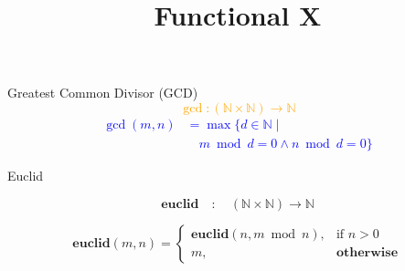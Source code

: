 \documentclass[12pt,t]{beamer}
\title{Functional X}
\begin{document}
{
}

\begin{frame}{Greatest Common Divisor (GCD)}
    \centering
    \Large %
    \textcolor{orange}{\[
        \gcd : (\mathbb{N} \times \mathbb{N}) \to \mathbb{N}
    \]}
        \vspace{0.5cm} %
    \textcolor{blue}{
        \begin{align*}
            \gcd(m,n) &= \max \big\{ d \in \mathbb{N} \mid \\
            &\quad m \bmod d = 0 \wedge n \bmod d = 0 \big\}
        \end{align*}
    }
\end{frame}

\begin{frame}{Euclid}

  \[
\textbf{euclid} \quad : \quad (\mathbb{N} \times \mathbb{N}) \to \mathbb{N}
\]

\[
\textbf{euclid}(m, n) =
\begin{cases}
    \textbf{euclid}(n, m \bmod n), & \text{if } n > 0 \\
    m, & \textbf{otherwise}
\end{cases}
\]

\end{frame}
\end{document}
